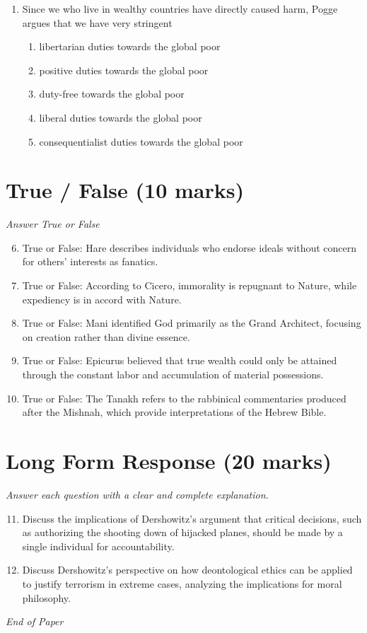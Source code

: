 \documentclass[12pt]{article}
\begin{document}
\begin{enumerate}[label=\arabic*.]
\begin{enumerate}[label=(\alph*)]
\end{enumerate}
\item Since we who live in wealthy countries have directly caused harm, Pogge argues that we have very stringent
\begin{enumerate}[label=(\alph*)]
    \item libertarian duties towards the global poor
    \item positive duties towards the global poor
    \item duty-free towards the global poor
    \item liberal duties towards the global poor
    \item consequentialist duties towards the global poor
\end{enumerate}
\end{enumerate}

\section*{True / False (10 marks)}
\textit{Answer True or False}
\begin{enumerate}[label=\arabic*.]
\setcounter{enumi}{5}
\item True or False: Hare describes individuals who endorse ideals without concern for others' interests as fanatics.
\item True or False: According to Cicero, immorality is repugnant to Nature, while expediency is in accord with Nature.
\item True or False: Mani identified God primarily as the Grand Architect, focusing on creation rather than divine essence.
\item True or False: Epicurus believed that true wealth could only be attained through the constant labor and accumulation of material possessions.
\item True or False: The Tanakh refers to the rabbinical commentaries produced after the Mishnah, which provide interpretations of the Hebrew Bible.
\end{enumerate}

\section*{Long Form Response (20 marks)}
\textit{Answer each question with a clear and complete explanation.}
\begin{enumerate}[label=\arabic*.]
\setcounter{enumi}{10}
\item Discuss the implications of Dershowitz's argument that critical decisions, such as authorizing the shooting down of hijacked planes, should be made by a single individual for accountability.
\item Discuss Dershowitz's perspective on how deontological ethics can be applied to justify terrorism in extreme cases, analyzing the implications for moral philosophy.
\end{enumerate}

\vfill
\noindent\textit{End of Paper}
\end{document}
